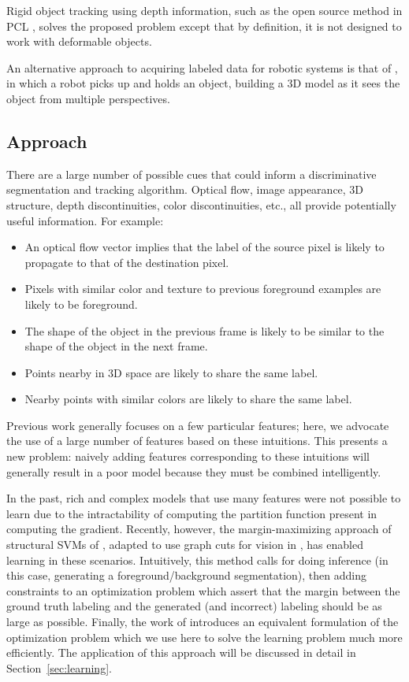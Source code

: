 \documentclass[conference]{IEEEtran}
\begin{document}
Rigid object tracking using depth information, such as the open source method in PCL \cite{rusu2011a}, solves the proposed problem except that by definition, it is not designed to work with deformable objects.

An alternative approach to acquiring labeled data for robotic systems is that of \citet{krainin2011a}, in which a robot picks up and holds an object, building a 3D model as it sees the object from multiple perspectives.

\subsection{Approach}
\label{sec:intuition}

There are a large number of possible cues that could inform a discriminative segmentation and tracking algorithm.  Optical flow, image appearance, 3D structure, depth discontinuities, color discontinuities, etc., all provide potentially useful information.  For example:
\begin{itemize}
  \item An optical flow vector implies that the label of the source pixel is likely to propagate to that of the destination pixel.
\item Pixels with similar color and texture to previous foreground examples are likely to be foreground.
\item The shape of the object in the previous frame is likely to be similar to the shape of the object in the next frame.
\item Points nearby in 3D space are likely to share the same label.
\item Nearby points with similar colors are likely to share the same label.
\end{itemize}

Previous work generally focuses on a few particular features; here, we advocate the use of a large number of features based on these intuitions.  This presents a new problem: naively adding features corresponding to these intuitions will generally result in a poor model because they must be combined intelligently.

In the past, rich and complex models that use many features were not possible to learn due to the intractability of computing the partition function present in computing the gradient.  Recently, however, the margin-maximizing approach of structural SVMs of \cite{taskar2005a, tsochantaridis2005a}, adapted to use graph cuts for vision in \cite{szummer2008a}, has enabled learning in these scenarios.  Intuitively, this method calls for doing inference (in this case, generating a foreground/background segmentation), then adding constraints to an optimization problem which assert that the margin between the ground truth labeling and the generated (and incorrect) labeling should be as large as possible.  Finally, the work of \citet{joachims2009a} introduces an equivalent formulation of the optimization problem which we use here to solve the learning problem much more efficiently. The application of this approach will be discussed in detail in Section~\ref{sec:learning}.
\end{document}
